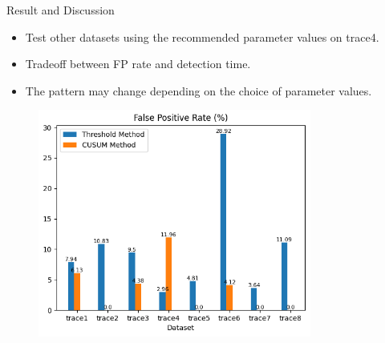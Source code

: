 \documentclass[aspectratio=169, 8pt]{beamer}
\begin{document}
\begin{frame}

\begin{columns}[T]

    \begin{column}{0.5\linewidth}
    
        \begin{block}{Result and Discussion}
            \begin{itemize}
                \item Test other datasets using the recommended parameter values on trace4.
                \item Tradeoff between FP rate and detection time.
                \item The pattern may change depending on the choice of parameter values.
            \end{itemize}
        \end{block}

        \begin{figure}
            \centering
            \includegraphics[width = 0.8\textwidth]{images/FP_rate.png}
            \label{fig:enter-label}
        \end{figure}        
        
    \end{column}
    

\end{columns}
\end{frame}
\end{document}
